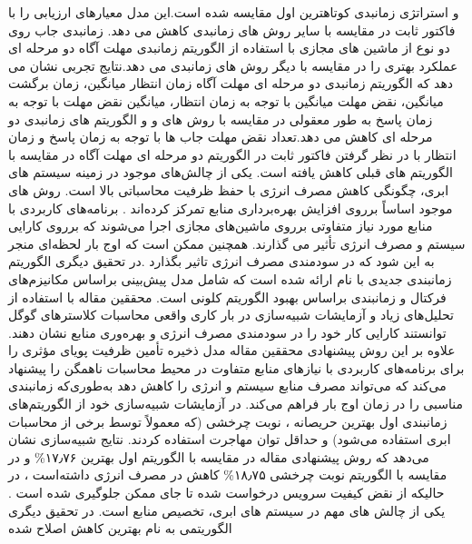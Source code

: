  و استراتژی زمانبدی کوتاهترین اول 
  مقایسه شده است.این مدل معیارهای ارزیابی را با فاکتور ثابت در مقایسه با سایر روش های زمانبدی کاهش می دهد. زمانبدی 
   جاب روی دو نوع از ماشین های مجازی با استفاده از الگوریتم زمانبدی مهلت آگاه دو مرحله ای عملکرد بهتری را در مقایسه با دیگر روش های زمانبدی می دهد.نتایج تجربی نشان می دهد که الگوریتم زمانبدی دو مرحله ای مهلت آگاه زمان انتظار میانگین، زمان برگشت میانگین، نقض مهلت میانگین با توجه به زمان انتظار، میانگین نقض مهلت با توجه به زمان پاسخ به طور معقولی در مقایسه با روش های 
   و
    و الگوریتم های زمانبدی دو مرحله ای کاهش می دهد.تعداد نقض مهلت جاب ها با توجه به زمان پاسخ و زمان انتظار با در نظر گرفتن فاکتور ثابت در الگوریتم دو مرحله ای مهلت آگاه در مقایسه با الگوریتم های قبلی کاهش یافته است.
 یکی از چالش‌های موجود در زمینه سیستم های ابری، چگونگی کاهش مصرف انرژی با حفظ ظرفیت محاسباتی بالا است. روش های موجود اساساً برروی افزایش بهره‌برداری منابع تمرکز کرده‌اند . برنامه‌های کاربردی با منابع مورد نیاز متفاوتی برروی ماشین‌های مجازی اجرا می‌شوند که برروی کارایی سیستم و مصرف انرژی تأثیر می گذارند. همچنین ممکن است که اوج بار
  لحظه‌ای منجر به این شود  که در سودمندی مصرف انرژی تاثیر بگذارد .در تحقیق دیگری
\cite{num14}
  الگوریتم زمانبندی جدیدی با نام
  ارائه شده است که شامل مدل پیش‌بینی بر‌اساس مکانیزم‌های فرکتال
  و
   زمانبندی براساس بهبود الگوریتم کلونی است.  محققین مقاله با استفاده از تحلیل‌های زیاد و آزمایشات شبیه‌سازی در بار کاری واقعی محاسبات کلاسترهای گوگل توانستند کارایی کار خود را در سودمندی مصرف انرژی و بهره‌وری منابع نشان دهند. علاوه بر این روش پیشنهادی محققین مقاله مدل ذخیره تأمین ظرفیت پویای مؤثری را برای برنامه‌های کاربردی با نیازهای منابع متفاوت در محیط محاسبات ناهمگن را پیشنهاد می‌کند که می‌تواند مصرف منابع سیستم و انرژی را کاهش دهد به‌طوری‌که زمانبندی مناسبی را در زمان اوج بار فراهم می‌کند.  در آزمایشات شبیه‌سازی خود از الگوریتم‌های زمانبندی اول بهترین حریصانه
   ،
    نوبت چرخشی
     (که معمولاً توسط برخی از محاسبات ابری استفاده می‌شود)  و حداقل توان مهاجرت استفاده کردند. نتایج شبیه‌سازی نشان می‌دهد که روش پیشنهادی مقاله در مقایسه با الگوریتم اول بهترین
۱۷٫۷۶\%
     و در مقایسه با الگوریتم نوبت چرخشی
۱۸٫۷۵\%
     کاهش در مصرف انرژی داشته‌است ، در حالیکه از نقض کیفیت سرویس درخواست شده تا جای ممکن جلوگیری شده است .
     \قسمت{روش پاتل}
یکی از چالش های مهم در سیستم های ابری، تخصیص منابع است. در تحقیق دیگری 
\cite{num15}
الگوریتمی به نام  بهترین کاهش اصلاح شده
